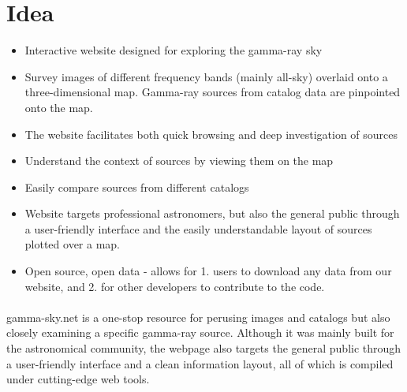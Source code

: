 \section{Idea}

\begin{itemize}

\item Interactive website designed for exploring the gamma-ray sky

\item Survey images of different frequency bands (mainly all-sky) overlaid onto a three-dimensional map. Gamma-ray sources from catalog data are pinpointed onto the map.

\item The website facilitates both quick browsing and deep investigation of sources

\item Understand the context of sources by viewing them on the map

\item Easily compare sources from different catalogs

\item Website targets professional astronomers, but also the general public through
a user-friendly interface and the easily understandable layout of sources plotted over a map.

\item Open source, open data - allows for 1. users to download any data from our website, and 2. for other developers to contribute to the code.

\end{itemize}

\pagebreak

\paragraph{}    gamma-sky.net is a one-stop resource for perusing images and catalogs but also closely examining a specific gamma-ray source.
    Although it was mainly built for the astronomical community, the webpage also targets the general public through a
    user-friendly interface and a clean information layout, all of which is compiled under cutting-edge web tools. \par


